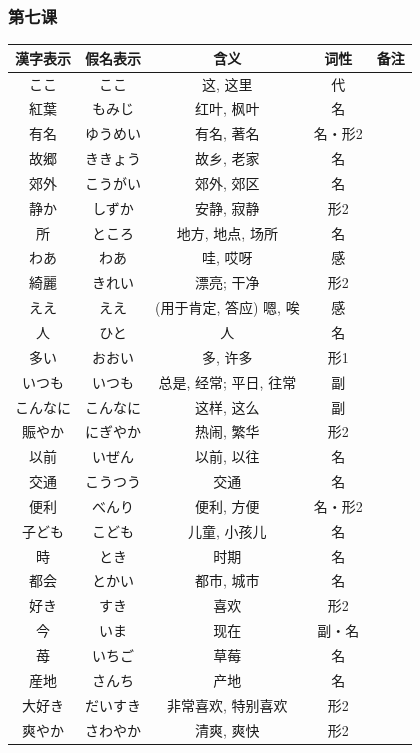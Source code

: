 \subsubsection{第七课}
\begin{longtable}{|c|c|c|c|c|}
    \hline
漢字表示 & 假名表示  & 含义 & 词性 & 备注 \\ \hline\hline  
ここ & ここ & 这, 这里 & 代 & \\ \hline
紅葉 & もみじ & 红叶, 枫叶 & 名 & \\ \hline
有名 & ゆうめい & 有名, 著名 & 名・形2 & \\ \hline
故郷 & ききょう & 故乡, 老家 & 名 & \\ \hline
郊外 & こうがい & 郊外, 郊区 & 名 & \\ \hline
静か & しずか & 安静, 寂静 & 形2 & \\ \hline
所 & ところ & 地方, 地点, 场所 & 名 & \\ \hline
わあ & わあ & 哇, 哎呀 & 感 & \\ \hline
綺麗 & きれい & 漂亮; 干净 & 形2 & \\ \hline
ええ & ええ & (用于肯定, 答应) 嗯, 唉 & 感 & \\ \hline
人 & ひと & 人 & 名 & \\ \hline
多い & おおい & 多, 许多 & 形1 & \\ \hline
いつも & いつも & 总是, 经常; 平日, 往常 & 副 & \\ \hline
こんなに & こんなに & 这样, 这么 & 副 & \\ \hline
賑やか & にぎやか & 热闹, 繁华 & 形2 & \\ \hline
以前 & いぜん & 以前, 以往 & 名 & \\ \hline
交通 & こうつう & 交通 & 名 & \\ \hline
便利 & べんり & 便利, 方便 & 名・形2 & \\ \hline
子ども & こども & 儿童, 小孩儿 & 名 & \\ \hline
時 & とき & 时期 & 名 & \\ \hline
都会 & とかい & 都市, 城市 & 名 & \\ \hline
好き & すき & 喜欢 & 形2 & \\ \hline
今 & いま & 现在 & 副・名 & \\ \hline
苺 & いちご & 草莓 & 名 & \\ \hline
産地 & さんち & 产地 & 名 & \\ \hline
大好き & だいすき & 非常喜欢, 特别喜欢 & 形2 & \\ \hline
爽やか & さわやか & 清爽, 爽快 & 形2 & \\ \hline

\end{longtable}
